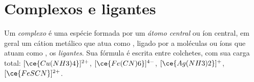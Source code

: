 \section{Complexos e ligantes}

\begin{definition}\label{def:b1:complexation:complex}
Um \emph{complexo} é uma espécie formada por um
\emph{átomo central} ou íon central, em geral um cátion
metálico que atua como , ligado por  a
moléculas ou íons que atuam como , os
\emph{ligantes}. Sua fórmula é escrita entre colchetes,
com sua carga total: $[\ce{Cu(NH3)4}]^{2+}$,
$[\ce{Fe(CN)6}]^{4-}$, $[\ce{Ag(NH3)2}]^{+}$, $[\ce{FeSCN}]^{2+}$.
\end{definition}

